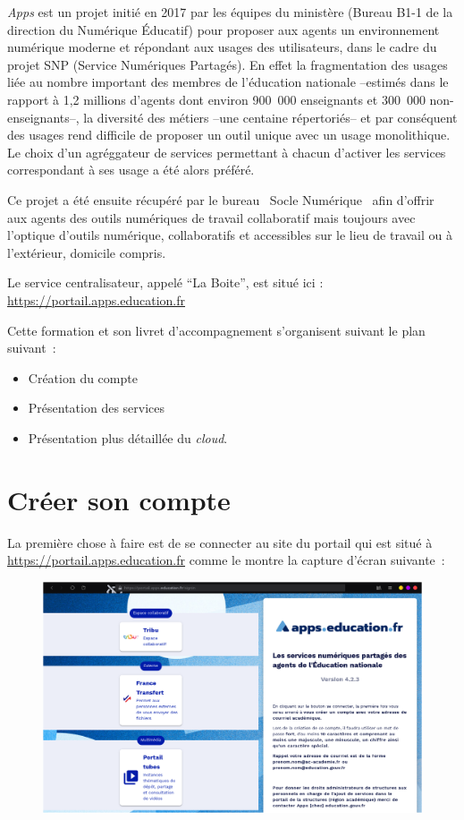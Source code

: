 \documentclass[a4paper, 11pt]{book}
\begin{document}
\emph{Apps} est un projet initié en 2017 par les équipes du ministère (Bureau B1-1 de la direction du Numérique Éducatif) pour proposer aux agents un environnement numérique  moderne et répondant aux usages des utilisateurs, dans le cadre du projet SNP (Service Numériques Partagés). 
En effet la fragmentation des usages liée au nombre important des membres de l'éducation nationale --estimés dans le rapport à 1,2 millions d'agents dont environ 900~000 enseignants et 300~000 non-enseignants--, la diversité des métiers --une centaine répertoriés-- et par conséquent des usages rend difficile de proposer un outil unique avec un usage monolithique. 
Le choix d'un agréggateur de services permettant à chacun d'activer les services correspondant à ses usage a été alors préféré.

Ce projet a été ensuite récupéré par le bureau \og~Socle Numérique~\fg{} afin d'offrir aux agents des outils numériques de travail collaboratif mais toujours avec l'optique d'outils numérique, collaboratifs et accessibles sur le lieu de travail ou à l'extérieur, domicile compris.

Le service centralisateur, appelé ``La Boite'',  est situé ici : \url{https://portail.apps.education.fr}

Cette formation et son livret d'accompagnement s'organisent suivant le plan suivant~:
\begin{itemize}
    \item Création du compte
    \item Présentation des services
    \item Présentation plus détaillée du \emph{cloud\/}.
\end{itemize}

\chapter*{Créer son compte}

La première chose à faire est de se connecter au site du portail qui est situé à \url{https://portail.apps.education.fr} comme le montre la capture d'écran suivante~:
\begin{figure}
    \centering
    \includegraphics{Captures/portail.site.web.png}
\end{figure}
\end{document}
